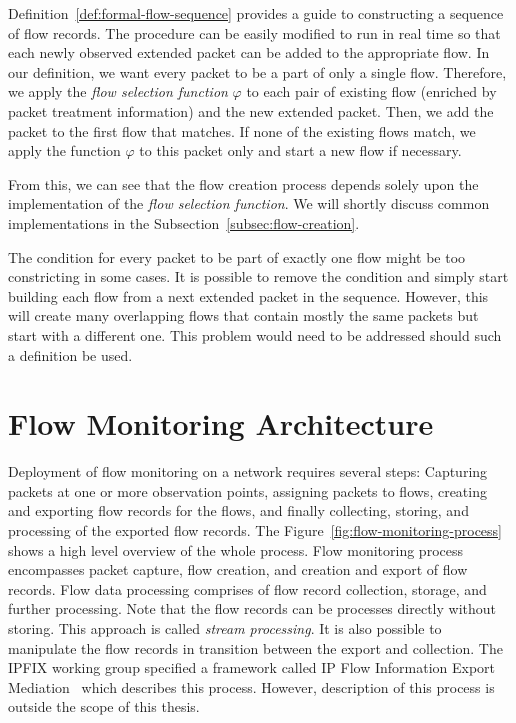 Definition~\ref{def:formal-flow-sequence} provides a guide to constructing a sequence of flow records. The procedure can be easily modified to run in real time so that each newly observed extended packet can be added to the appropriate flow. In our definition, we want every packet to be a part of only a single flow. Therefore, we apply the \emph{flow selection function} $\varphi$ to each pair of existing flow (enriched by packet treatment information) and the new extended packet. Then, we add the packet to the first flow that matches. If none of the existing flows match, we apply the function $\varphi$ to this packet only and start a new flow if necessary. 

From this, we can see that the flow creation process depends solely upon the implementation of the \emph{flow selection function}. We will shortly discuss common implementations in the Subsection~\ref{subsec:flow-creation}.

The condition for every packet to be part of exactly one flow might be too constricting in some cases. It is possible to remove the condition and simply start building each flow from a next extended packet in the sequence. However, this will create many overlapping flows that contain mostly the same packets but start with a different one. This problem would need to be addressed should such a definition be used.

\section{Flow Monitoring Architecture}\label{sec:flow-monitoring-architecture}

Deployment of flow monitoring on a network requires several steps: Capturing packets at one or more observation points, assigning packets to flows, creating and exporting flow records for the flows, and finally collecting, storing, and processing of the exported flow records. 
The Figure~\ref{fig:flow-monitoring-process} shows a high level overview of the whole process. Flow monitoring process encompasses packet capture, flow creation, and creation and export of flow records. Flow data processing comprises of flow record collection, storage, and further processing. Note that the flow records can be processes directly without storing. This approach is called \emph{stream processing}. It is also possible to manipulate the flow records in transition between the export and collection. The IPFIX working group specified a framework called IP Flow Information Export Mediation~\cite{rfc6183} which describes this process. However, description of this process is outside the scope of this thesis.


